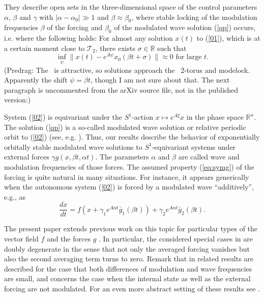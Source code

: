 \begin{description}
They describe open sets in the three-dimensional space
of the control parameters $\alpha$, $\beta$ and $\gamma$ with $|\alpha-\alpha_{0}|\gg1$
and $\beta\approx\beta_{0}$, where stable locking of the modulation
frequencies $\beta$ of the forcing and $\beta_{0}$ of the modulated
wave solution (\ref{qp}) occurs, i.e. where the following holds:
For almost any solution $x(t)$ to (\ref{01}), which is at a certain
moment close to $\mathcal{T}_{2}$, there exists $\sigma\in\mathbb{R}$
such that
\begin{equation}
\inf_{\psi}\|x(t)-e^{A\psi}x_{0}(\beta t+\sigma)\|\approx0\mbox{ for large }t.
\label{eq:cond}
\end{equation}
(Predrag:
The \rpo\ is attractive, so solutions approach the \rpo\ 2-torus and
modelock. Apparently the shift $\psi = \beta t$, though I am not sure
about that. The next paragraph is uncommented from the arXiv source file, not
in the published version:)

System (\ref{02}) is equivariant under the $S^{1}$-action $x\mapsto e^{A\xi}x$
in the phase space $\mathbb{R}^{n}$. The solution (\ref{qp}) is
a so-called modulated wave solution or relative periodic orbit to
(\ref{02}) (see, e.g. \cite{Rand82}). %
Thus, our results describe
the behavior of exponentially orbitally stable modulated wave solutions
to $S^{1}$-equivariant systems under external forces $\gamma g(x,\beta t,\alpha t)$.
The parameters $\alpha$ and $\beta$ are called wave and modulation
frequencies of those forces. The assumed property (\ref{eq:symg})
of the forcing is quite natural in many situations.
For instance, it appears generically when the autonomous system
(\ref{02}) is forced by a modulated
wave {}``additively'', e.g., as
\[
\frac{dx}{dt}=f(x+\gamma_{1}
e^{A\alpha t}\bar{g}_{1}(\beta t))+\gamma_{2}e^{A\alpha t}\bar{g}_{2}(\beta t).
\]

The present paper extends previous work on this topic for particular
types of the vector field $f$ and the forces $g$ \cite{Schneider2005,Samoilenko2005,Recke2010}.
In particular, the considered special cases in \cite{Schneider2005,Samoilenko2005,Recke2010}
are doubly degenerate in the sense that not only the averaged forcing
vanishes but also the second averaging term turns to zero.
Remark that in \cite{Recke1998} related results are described for
the case that both differences of modulation and wave frequencies
are small, and \cite{Recke1998a} concerns the case when the internal
state as well as the external forcing are not modulated. For an even
more abstract setting of these results see \cite{Chillingworth2000}.


\end{description}
